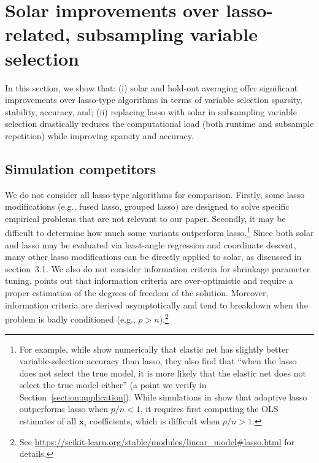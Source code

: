 \documentclass[11pt,authoryear]{elsarticle}
\begin{document}

\section{Solar improvements over lasso-related, subsampling variable selection\label{section:comp}}

In this section, we show that: (i) solar and hold-out averaging offer significant improvements over lasso-type algorithms in terms of variable selection sparsity, stability, accuracy, and; (ii) replacing lasso with solar in subsampling variable selection drastically reduces the computational load (both runtime and subsample repetition) while improving sparsity and accuracy.

\subsection{Simulation competitors}

We do not consider all lasso-type algorithms for comparison. Firstly, some lasso modifications (e.g., fused lasso, grouped lasso) are designed to solve specific empirical problems that are not relevant to our paper. Secondly, it may be difficult to determine how much some variants outperform lasso.\footnote{For example, while \citet{jia2010model} show numerically that elastic net has slightly better variable-selection accuracy than lasso, they also find that ``when the lasso does not select the true model, it is more likely that the elastic net does not select the true model either'' (a point we verify in Section~\ref{section:application}). While simulations in \citet{zou2006adaptive} show that adaptive lasso outperforms lasso when $p/n<1$, it requires first computing the OLS estimates of all $\mathbf{x}_i$ coefficients, which is difficult when $p/n>1$.} Since both solar and lasso may be evaluated via least-angle regression and coordinate descent, many other lasso modifications can be directly applied to solar, as discussed in section~3.1. We also do not consider information criteria for shrinkage parameter tuning. \citet{scikit-learn} points out that information criteria are over-optimistic and require a proper estimation of the degrees of freedom of the solution. Moreover, information criteria are derived asymptotically and tend to breakdown when the problem is badly conditioned (e.g., $p > n$).\footnote{See \url{https://scikit-learn.org/stable/modules/linear_model\#lasso.html} for details.}
\end{document}
